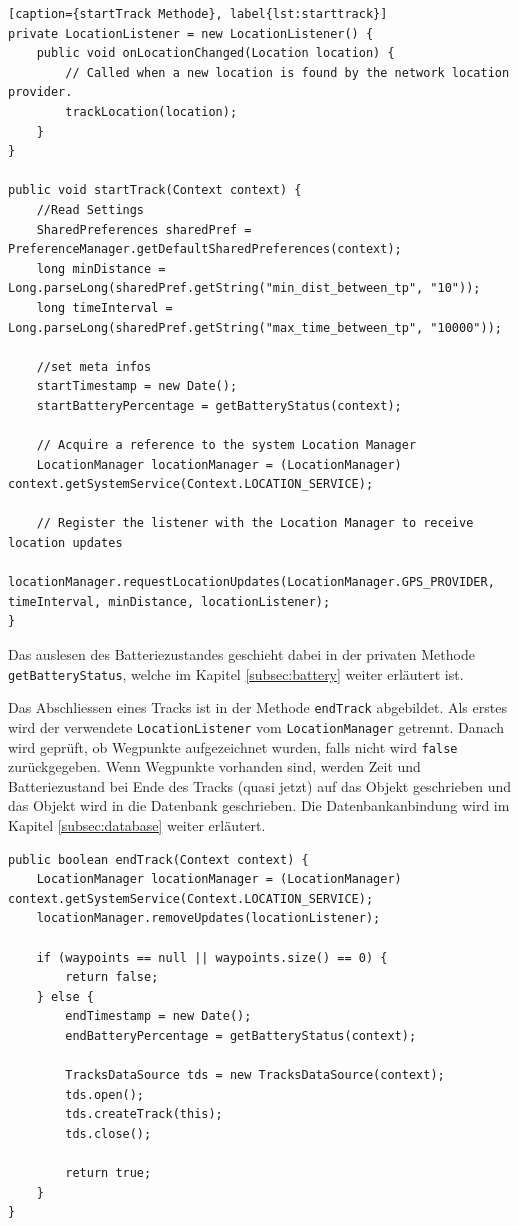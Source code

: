 \begin{lstlisting}[caption={startTrack Methode}, label{lst:starttrack}]
private LocationListener = new LocationListener() {
	public void onLocationChanged(Location location) {
		// Called when a new location is found by the network location provider.
		trackLocation(location);
	}
}

public void startTrack(Context context) {
	//Read Settings
	SharedPreferences sharedPref = PreferenceManager.getDefaultSharedPreferences(context);
	long minDistance = Long.parseLong(sharedPref.getString("min_dist_between_tp", "10"));
	long timeInterval = Long.parseLong(sharedPref.getString("max_time_between_tp", "10000"));
	
	//set meta infos
	startTimestamp = new Date();
	startBatteryPercentage = getBatteryStatus(context);

	// Acquire a reference to the system Location Manager
	LocationManager locationManager = (LocationManager) context.getSystemService(Context.LOCATION_SERVICE);

	// Register the listener with the Location Manager to receive location updates
	locationManager.requestLocationUpdates(LocationManager.GPS_PROVIDER, timeInterval, minDistance, locationListener);
}
\end{lstlisting}

Das auslesen des Batteriezustandes geschieht dabei in der privaten Methode \lstinline$getBatteryStatus$, welche im Kapitel \ref{subsec:battery} weiter erläutert ist.

Das Abschliessen eines Tracks ist in der Methode \lstinline$endTrack$ abgebildet. Als erstes wird der verwendete \lstinline$LocationListener$ vom \lstinline$LocationManager$ getrennt. Danach wird geprüft, ob Wegpunkte aufgezeichnet wurden, falls nicht wird \lstinline$false$ zurückgegeben. Wenn Wegpunkte vorhanden sind, werden Zeit und Batteriezustand bei Ende des Tracks (quasi jetzt) auf das Objekt geschrieben und das Objekt wird in die Datenbank geschrieben. Die Datenbankanbindung wird im Kapitel \ref{subsec:database} weiter erläutert.

\begin{lstlisting}[caption={endTrack Methode}, label={lst:endtrack}]
public boolean endTrack(Context context) {
	LocationManager locationManager = (LocationManager) context.getSystemService(Context.LOCATION_SERVICE);
	locationManager.removeUpdates(locationListener);

	if (waypoints == null || waypoints.size() == 0) {
		return false;
	} else {
		endTimestamp = new Date();
		endBatteryPercentage = getBatteryStatus(context);

		TracksDataSource tds = new TracksDataSource(context);
		tds.open();
		tds.createTrack(this);
		tds.close();

		return true;
	}
}
\end{lstlisting}

